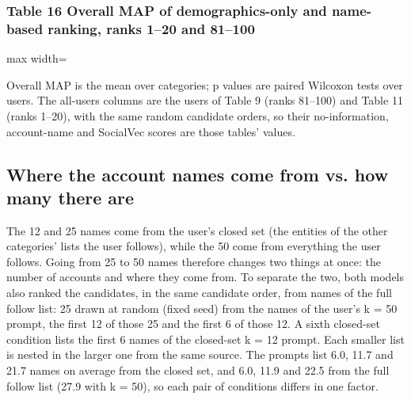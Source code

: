 \documentclass[10pt]{article}
\begin{document}
\subsubsection*{Table 16 \textperiodcentered{} Overall MAP of demographics-only and name-based ranking, ranks 1--20 and 81--100}
\begin{center}\begin{adjustbox}{max width=\linewidth}

\end{adjustbox}\end{center}

{\small Overall MAP is the mean over categories; p values are paired Wilcoxon tests over users. The all-users columns are the users of Table 9 (ranks 81--100) and Table 11 (ranks 1--20), with the same random candidate orders, so their no-information, account-name and SocialVec scores are those tables' values.}

\subsection*{Where the account names come from vs. how many there are}
The 12 and 25 names come from the user's closed set (the entities of the other categories' lists the user follows), while the 50 come from everything the user follows. Going from 25 to 50 names therefore changes two things at once: the number of accounts and where they come from. To separate the two, both models also ranked the candidates, in the same candidate order, from names of the full follow list: 25 drawn at random (fixed seed) from the names of the user's k = 50 prompt, the first 12 of those 25 and the first 6 of those 12. A sixth closed-set condition lists the first 6 names of the closed-set k = 12 prompt. Each smaller list is nested in the larger one from the same source. The prompts list 6.0, 11.7 and 21.7 names on average from the closed set, and 6.0, 11.9 and 22.5 from the full follow list (27.9 with k = 50), so each pair of conditions differs in one factor.
\end{document}

